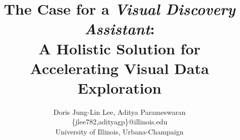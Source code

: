\documentclass[11pt]{article}
\def\plainauthor{Doris Jung-Lin Lee, Aditya Parameswaran}
\begin{document}
\title{The Case for a {\em Visual Discovery Assistant}: \\ A Holistic Solution for Accelerating Visual Data Exploration}
\author{\plainauthor\\
\{jlee782,adityagp\}@illinois.edu\\
University of Illinois, Urbana-Champaign}
\maketitle
\end{document}
